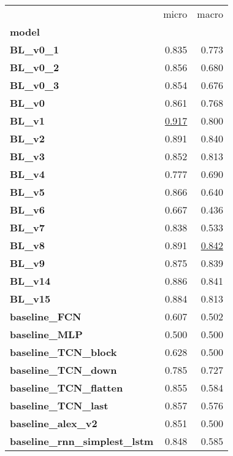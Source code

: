 \begin{adjustbox}{width=\textwidth}
\begin{tabular}{lrr}
\toprule
{} &  micro &  macro \\
\textbf{model                             } &        &        \\
\midrule
\textbf{BL\_v0\_1                   } &  0.835 &  0.773 \\
\textbf{BL\_v0\_2                   } &  0.856 &  0.680 \\
\textbf{BL\_v0\_3                   } &  0.854 &  0.676 \\
\textbf{BL\_v0                     } &  0.861 &  0.768 \\
\textbf{BL\_v1                     } &  \underline{0.917} &  0.800 \\
\textbf{BL\_v2                     } &  0.891 &  0.840 \\
\textbf{BL\_v3                     } &  0.852 &  0.813 \\
\textbf{BL\_v4                     } &  0.777 &  0.690 \\
\textbf{BL\_v5                     } &  0.866 &  0.640 \\
\textbf{BL\_v6                     } &  0.667 &  0.436 \\
\textbf{BL\_v7                     } &  0.838 &  0.533 \\
\textbf{BL\_v8                     } &  0.891 &  \underline{0.842} \\
\textbf{BL\_v9                     } &  0.875 &  0.839 \\
\textbf{BL\_v14                    } &  0.886 &  0.841 \\
\textbf{BL\_v15                    } &  0.884 &  0.813 \\
\textbf{baseline\_FCN              } &  0.607 &  0.502 \\
\textbf{baseline\_MLP              } &  0.500 &  0.500 \\
\textbf{baseline\_TCN\_block        } &  0.628 &  0.500 \\
\textbf{baseline\_TCN\_down         } &  0.785 &  0.727 \\
\textbf{baseline\_TCN\_flatten      } &  0.855 &  0.584 \\
\textbf{baseline\_TCN\_last                 } &  0.857 &  0.576 \\
\textbf{baseline\_alex\_v2          } &  0.851 &  0.500 \\
\textbf{baseline\_rnn\_simplest\_lstm} &  0.848 &  0.585 \\
\bottomrule
\end{tabular}
\end{adjustbox}